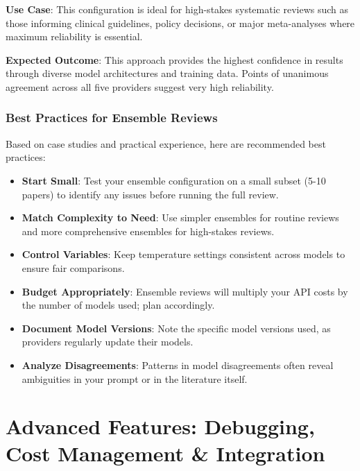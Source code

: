 \textbf{Use Case}: This configuration is ideal for high-stakes systematic reviews such as those informing clinical guidelines, policy decisions, or major meta-analyses where maximum reliability is essential.

\textbf{Expected Outcome}: This approach provides the highest confidence in results through diverse model architectures and training data. Points of unanimous agreement across all five providers suggest very high reliability.


\subsection{Best Practices for Ensemble Reviews}

Based on case studies and practical experience, here are recommended best practices:

\begin{itemize}
    \item \textbf{Start Small}: Test your ensemble configuration on a small subset (5-10 papers) to identify any issues before running the full review.
    \item \textbf{Match Complexity to Need}: Use simpler ensembles for routine reviews and more comprehensive ensembles for high-stakes reviews.
    \item \textbf{Control Variables}: Keep temperature settings consistent across models to ensure fair comparisons.
    \item \textbf{Budget Appropriately}: Ensemble reviews will multiply your API costs by the number of models used; plan accordingly.
    \item \textbf{Document Model Versions}: Note the specific model versions used, as providers regularly update their models.
    \item \textbf{Analyze Disagreements}: Patterns in model disagreements often reveal ambiguities in your prompt or in the literature itself.
\end{itemize}


\chapter[Debugging, Costs \& Integration]{Advanced Features: Debugging, Cost Management \& Integration} \label{chap:advanced_features}

